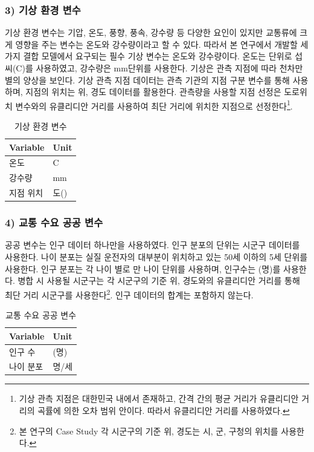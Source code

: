 \documentclass[11pt]{report}
\begin{document}
\subsubsection*{3) 기상 환경 변수}
기상 환경 변수는 기압, 온도, 풍향, 풍속, 강수량 등 다양한 요인이 있지만 교통류에 크게 영향을 주는 변수는 온도와 강수량이라고 할 수 있다. 
따라서 본 연구에서 개발할 세가지 결합 모델에서 요구되는 필수 기상 변수는 온도와 강수량이다.
온도는 단위로 섭씨(\textdegree C)를 사용하였고, 강수량은 mm단위를 사용한다.
기상은 관측 지점에 따라 천차만별의 양상을 보인다.
기상 관측 지점 데이터는 관측 기관의 지점 구분 변수를 통해 사용하며, 지점의 위치는 위, 경도 데이터를 활용한다. 
관측량을 사용할 지점 선정은 도로위치 변수와의 유클리디안 거리를 사용하여 최단 거리에 위치한 지점으로 선정한다\footnote{기상 관측 지점은 대한민국 내에서 존재하고, 간격 간의 평균 거리가 유클리디안 거리의 곡률에 의한 오차 범위 안이다. 따라서 유클리디안 거리를 사용하였다.}. 

\begin{table}[H]
	\begin{center}
	\vspace{0.5cm}
	\begin{tabular}{|l|l|}
		\hline
		\rowcolor[HTML]{C0C0C0} 
		Variable & Unit \\ \hline
		온도       & \textdegree C   \\ \hline
		강수량      & mm   \\ \hline
		지점 위치    & 도(\textdegree) \\ \hline
	\end{tabular}
	\end{center}
	\caption{기상 환경 변수}
	\label{tab:weather_var}
\end{table}

\subsubsection*{4) 교통 수요 공공 변수}
공공 변수는 인구 데이터 하나만을 사용하였다. 인구 분포의 단위는 시군구 데이터를 사용한다. 
나이 분포는 실질 운전자의 대부분이 위치하고 있는 50세 이하의 5세 단위를 사용한다.
인구 분포는 각 나이 별로 만 나이 단위를 사용하며, 인구수는 (명)를 사용한다. 
병합 시 사용될 시군구는 각 시군구의 기준 위, 경도와의 유클리디안 거리를 통해 최단 거리 시군구를 사용한다\footnote{본 연구의 Case Study 각 시군구의 기준 위, 경도는 시, 군, 구청의 위치를 사용한다.}. 
인구 데이터의 합계는 포함하지 않는다. 

\begin{table}[H]
	\begin{center}
	\vspace{0.5cm}
	\begin{tabular}{|l|l|}
	\hline
	\rowcolor[HTML]{C0C0C0} 
	Variable & Unit \\ \hline
	인구 수     & (명)  \\ \hline
	나이 분포    & 명/세 \\ \hline
	\end{tabular}
	\end{center}
	\caption{교통 수요 공공 변수}
	\label{tab:public_var}
\end{table}
\end{document}
